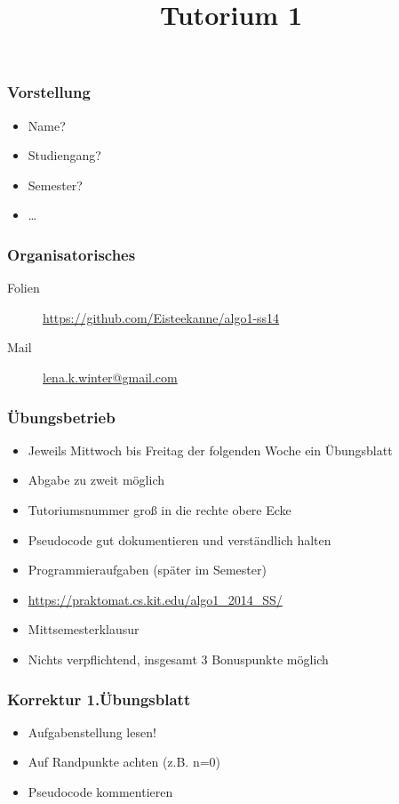 
\title[Algorithmen I SS 14]{Tutorium 1}



\begin{frame}
  \maketitle
\end{frame}

\begin{frame}
	\frametitle{Vorstellung}
	\begin{itemize}
		\item Name?
		\item Studiengang?
		\item Semester?
		\item …
	\end{itemize}
\end{frame}

\begin{frame}
	\frametitle{Organisatorisches}
	\begin{description}
		\item[Folien] \url{https://github.com/Eisteekanne/algo1-ss14}
		\item[Mail] \href{mailto:lena.k.winter@gmail.com}{lena.k.winter@gmail.com}
	\end{description}
\end{frame}

\begin{frame}
	\frametitle{Übungsbetrieb}
	\begin{itemize}
		\item Jeweils Mittwoch bis Freitag der folgenden Woche ein Übungsblatt
		\item Abgabe zu zweit möglich
		\item Tutoriumsnummer groß in die rechte obere Ecke
		\item Pseudocode gut dokumentieren und verständlich halten
		\item Programmieraufgaben (später im Semester)
		\item \url{https://praktomat.cs.kit.edu/algo1_2014_SS/}
		\item Mittsemesterklausur
		\item Nichts verpflichtend, insgesamt 3 Bonuspunkte möglich
	\end{itemize}
\end{frame}

\begin{frame}
	\frametitle{Korrektur 1.Übungsblatt}
	\begin{itemize}
		\item Aufgabenstellung lesen!
		\item Auf Randpunkte achten (z.B. n=0)
		\item Pseudocode kommentieren
	\end{itemize}

\end{frame}

